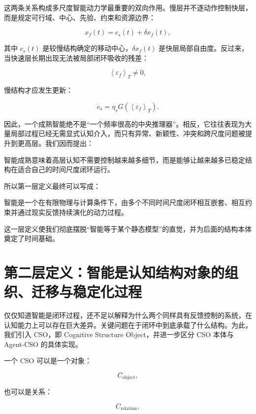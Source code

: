 这两条关系构成多尺度智能动力学最重要的双向作用。慢层并不逐动作控制快层，而是规定可行域、中心、先验、约束和资源边界：

\[
x_f(t)
=
c_s(t)
+
\delta x_f(t),
\]

其中 \(c_s(t)\) 是较慢结构确定的移动中心，\(\delta x_f(t)\) 是快层局部自由度。反过来，当快速层长期出现无法被局部闭环吸收的残差：

\[
\left\langle
\varepsilon_f
\right\rangle_T
\neq
0,
\]

慢结构才应发生更新：

\[
\dot c_s
=
\eta_s
G
\left(
\left\langle
\varepsilon_f
\right\rangle_T
\right).
\]

因此，一个成熟智能绝不是“一个频率很高的中央推理器”。相反，它往往表现为大量局部过程已经无需显式认知介入，而只有异常、新颖性、冲突和跨尺度问题被提升到更高层。我们因而提出：

\begin{statementbox}
\centering
{}
\end{statementbox}

智能成熟意味着高层认知不需要控制越来越多细节，而是能够让越来越多已稳定结构在适合自己的时间尺度闭环运行。

所以第一层定义最终可以写成：

\begin{definition*}
智能是一个在有限物理与计算条件下，由多个不同时间尺度闭环相互嵌套、相互约束并通过现实反馈持续演化的动力过程。
\end{definition*}

这一层定义使我们彻底摆脱“智能等于某个静态模型”的直觉，并为后面的结构本体奠定了时间基础。

\section{第二层定义：智能是认知结构对象的组织、迁移与稳定化过程}

仅仅知道智能是闭环过程，还不足以解释为什么两个同样具有反馈控制的系统，在认知能力上可以存在巨大差异。关键问题在于闭环中到底承载了什么结构。为此，我们引入 CSO，即 Cognitive Structure Object，并进一步区分 CSO 本体与 Agent-CSO 的具体实现。

一个 CSO 可以是一个对象：

\[
C_{\mathrm{object}},
\]

也可以是关系：

\[
C_{\mathrm{relation}},
\]

